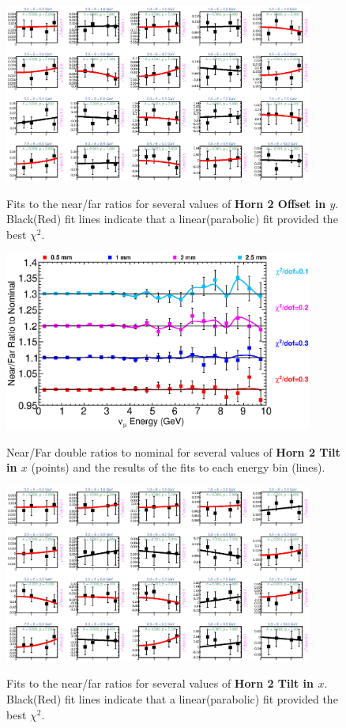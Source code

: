 \begin{figure}[hb]
  \begin{center}
    {\includegraphics[width=4.0in]{figures/Horn2YOffset_nof_fits.eps}}
  \end{center}
\caption{ Fits to the near/far ratios for several values of {\bf Horn 2 Offset in $y$}. Black(Red) fit lines indicate that a linear(parabolic) fit provided the best $\chi^2$. }
\end{figure}



\begin{figure}[ht]
  \begin{center}
    {\includegraphics[width=4.0in]{figures/Horn2XTilt_nof_summary.eps}}
  \end{center}
\caption{ Near/Far double ratios to nominal for several values of {\bf Horn 2 Tilt in $x$} (points) and the results of the fits to each energy bin (lines).}
\end{figure}

\begin{figure}[hb]
  \begin{center}
    {\includegraphics[width=4.0in]{figures/Horn2XTilt_nof_fits.eps}}
  \end{center}
\caption{ Fits to the near/far ratios for several values of {\bf Horn 2 Tilt in $x$}. Black(Red) fit lines indicate that a linear(parabolic) fit provided the best $\chi^2$. }
\end{figure}

